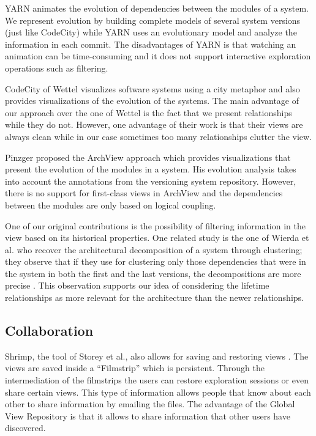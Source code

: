 \documentclass[preprint,12pt]{elsarticle}
\begin{document}
YARN \cite{hindle-yarn} animates the evolution of dependencies between the modules of a system. We represent evolution by building complete models of several system versions (just like CodeCity) while YARN uses an evolutionary model and analyze the information in each commit. The disadvantages of YARN is that watching an animation can be time-consuming and it does not support interactive exploration operations such as filtering. 

CodeCity of Wettel \cite{wettel-icse11} visualizes software systems using a city metaphor and also provides visualizations of the evolution of the systems. The main advantage of our approach over the one of Wettel is the fact that we present relationships while they do not. However, one advantage of their work is that their views are always clean while in our case sometimes too many relationships clutter the view.

Pinzger proposed the ArchView approach \cite{pinzger-thesis} which provides visualizations that present the evolution of the modules in a system. His evolution analysis takes into account the annotations from the versioning system repository. However, there is no support for first-class views in ArchView and the dependencies between the modules are only based on logical coupling. 

One of our original contributions is the possibility of filtering information in the view based on its historical properties. One related study is the one of Wierda et al. who recover the architectural decomposition of a system through clustering; they observe that if they use for clustering only those dependencies that were in the system in both the first and the last versions, the decompositions are more precise \cite{wierda-clustering}. This observation supports our idea of considering the lifetime relationships as more relevant for the architecture than the newer relationships. 

\subsection {Collaboration} 

Shrimp, the tool of Storey et al., also allows for saving and restoring views \cite{rayside-flow}. The views are saved inside a ``Filmstrip'' which is persistent. Through the intermediation of the filmstrips the users can restore exploration sessions or even share certain views. This type of information allows people that know about each other to share information by emailing the files. The advantage of the Global View Repository is that it allows to share information that other users have discovered. 
\end{document}
